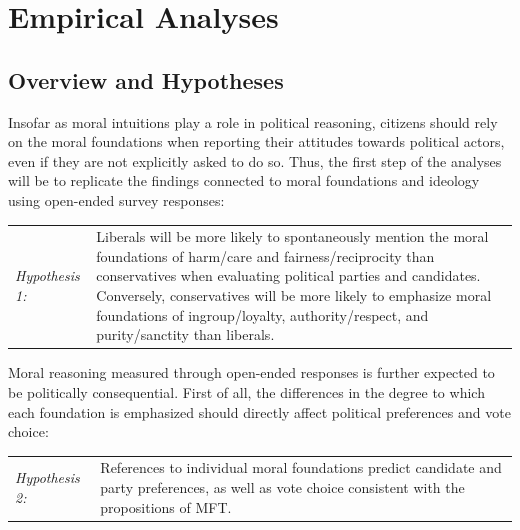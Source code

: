 \documentclass[12pt]{article}
\begin{document}
\section{Empirical Analyses}

\subsection{Overview and Hypotheses}



Insofar as moral intuitions play a role in political reasoning, citizens should rely on the moral foundations when reporting their attitudes towards political actors, even if they are not explicitly asked to do so. Thus, the first step of the analyses will be to replicate the findings connected to moral foundations and ideology using open-ended survey responses:

\vspace{0.3cm}
\begin{tabular}{lp{12cm}}
\textsl{Hypothesis 1:} & Liberals will be more likely to spontaneously mention the moral foundations of harm/care and fairness/reciprocity  than conservatives when evaluating political parties and candidates. Conversely, conservatives will be more likely to emphasize moral foundations of ingroup/loyalty, authority/respect, and purity/sanctity than liberals.
\end{tabular}
\vspace{0.5cm}

Moral reasoning measured through open-ended responses is further expected to be politically consequential. First of all, the differences in the degree to which each foundation is emphasized should directly affect political preferences and vote choice:

\vspace{0.3cm}
\begin{tabular}{lp{12cm}}
\textsl{Hypothesis 2:} & References to individual moral foundations predict candidate and party preferences, as well as vote choice consistent with the propositions of MFT. \\
\end{tabular}
\vspace{0.5cm}
\end{document}
